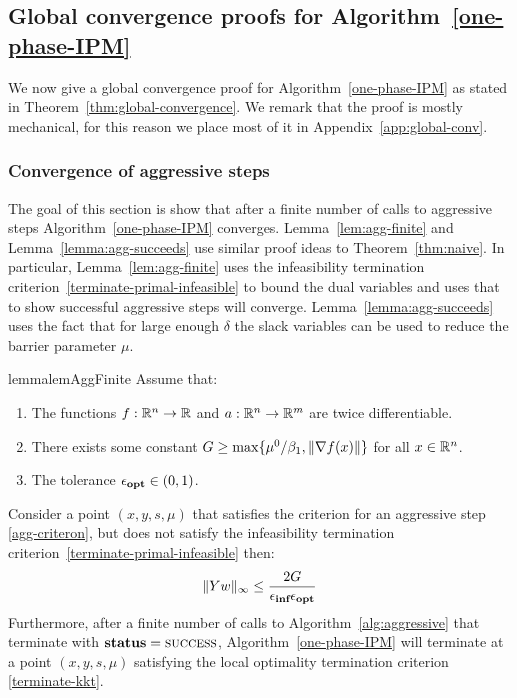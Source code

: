 \documentclass{article}
\begin{document}
\subsection{Global convergence proofs for Algorithm~\ref{one-phase-IPM}}\label{sec:global-conv}

We now give a global convergence proof for Algorithm~\ref{one-phase-IPM} as stated in Theorem~\ref{thm:global-convergence}. We remark that the proof is mostly mechanical, for this reason we place most of it in Appendix~\ref{app:global-conv}. 



\subsubsection{Convergence of aggressive steps}

The goal of this section is show that after a finite number of calls to aggressive steps Algorithm~\ref{one-phase-IPM} converges. Lemma~\ref{lem:agg-finite} and Lemma~\ref{lemma:agg-succeeds} use similar proof ideas to Theorem~\ref{thm:naive}. In particular, Lemma~\ref{lem:agg-finite} uses the infeasibility termination criterion~\eqref{terminate-primal-infeasible} to bound the dual variables and uses that to show successful aggressive steps will converge. Lemma~\ref{lemma:agg-succeeds} uses the fact that for large enough $\delta$ the slack variables can be used to reduce the barrier parameter $\mu$.


\begin{restatable}{lemma}{lemAggFinite}\label{lem:agg-finite}
Assume that:
\begin{enumerate}
\item The functions $f : \mathbb{R}^{n} \rightarrow \mathbb{R}$ and $a : \mathbb{R}^{n} \rightarrow \mathbb{R}^{m}$ are twice differentiable. 
\item There exists some constant $G \ge \max\{ \mu^{0} / \beta_{1}, \| \nabla f(x) \|  \}$ for all $x \in \mathbb{R}^{n}$. 
\item The tolerance $\epsilon_{\textbf{opt}} \in (0,1)$.
\end{enumerate}
Consider a point $(x, y, s, \mu)$ that satisfies the criterion for an aggressive step \eqref{agg-criteron}, but does not satisfy the infeasibility termination criterion~\eqref{terminate-primal-infeasible} then:
$$
\| Y w \|_{\infty} \le \frac{2 G}{\epsilon_{\textbf{inf}} \epsilon_{\textbf{opt}}}
$$
Furthermore, after a finite number of calls to Algorithm~\ref{alg:aggressive} that terminate with $\textbf{status} = \textsc{success}$, Algorithm~\ref{one-phase-IPM} will terminate at a point $(x, y, s, \mu)$ satisfying the local optimality termination criterion \eqref{terminate-kkt}. 
\end{restatable}
\end{document}
